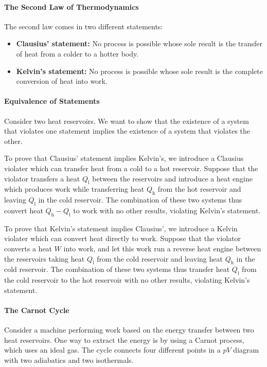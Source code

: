 \paragraph{The Second Law of Thermodynamics}
The second law comes in two different statements:
\begin{itemize}
	\item \textbf{Clausius' statement:} No process is possible whose sole result is the transfer of heat from a colder to a hotter body.
	\item \textbf{Kelvin's statement:} No process is possible whose sole result is the complete conversion of heat into work.
\end{itemize}

\paragraph{Equivalence of Statements}
Consider two heat reservoirs. We want to show that the existence of a system that violates one statement implies the existence of a system that violates the other.

To prove that Clausius' statement implies Kelvin's, we introduce a Clausius violater which can transfer heat from a cold to a hot reservoir. Suppose that the violator transfers a heat $Q_{\text{l}}$ between the reservoirs and introduce a heat engine which produces work while transferring heat $Q_{\text{h}}$ from the hot reservoir and leaving $Q_{\text{l}}$ in the cold reservoir. The combination of these two systems thus convert heat $Q_{\text{h}} - Q_{\text{l}}$ to work with no other results, violating Kelvin's statement.

To prove that Kelvin's statement implies Clausius', we introduce a Kelvin violater which can convert heat directly to work. Suppose that the violator converts a heat $W$ into work, and let this work run a reverse heat engine between the reservoirs taking heat $Q_{\text{l}}$ from the cold reservoir and leaving heat $Q_{\text{h}}$ in the cold reservoir. The combination of these two systems thus transfer heat $Q_{\text{l}}$ from the cold reservoir to the hot reservoir with no other results, violating Kelvin's statement.

\paragraph{The Carnot Cycle}
Consider a machine performing work based on the energy transfer between two heat reservoirs. One way to extract the energy is by using a Carnot process, which uses an ideal gas. The cycle connects four different points in a $pV$ diagram with two adiabatics and two isothermals.

